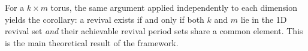 For a $k \times m$ torus, the same argument applied independently to
each dimension yields the corollary: a revival exists if and only if
both $k$ and $m$ lie in the 1D revival set \emph{and} their achievable
revival period sets share a common element. This is the main
theoretical result of the framework.
